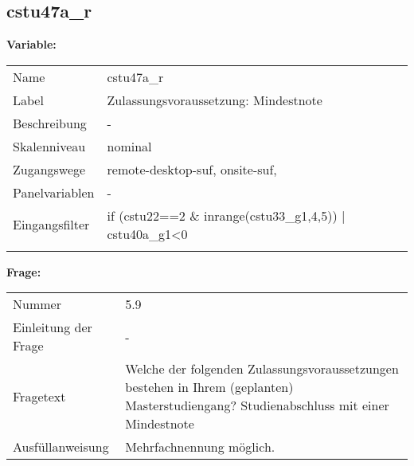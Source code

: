 	
	
	\subsection{cstu47a\_r}
	\label{subSection:cstu47a_r}

	\noindent\textbf{Variable:}\\
		\begin{tabular}{lL{11.3cm}}
			\label{tableVariable:cstu47a_r}
			Name & cstu47a\_r \\
			Label & Zulassungsvoraussetzung: Mindestnote \\
			Beschreibung & - \\
			Skalenniveau & nominal \\
			Zugangswege &
				remote-desktop-suf,
				onsite-suf,
 \\
			Panelvariablen & -
			 \\
			Eingangsfilter & if (cstu22==2 \& inrange(cstu33\_g1,4,5)) | cstu40a\_g1\textless{}0 \\
 \\
		\end{tabular}

		\vspace*{1 cm}
		\noindent\textbf{Frage:}\\
		\begin{tabular}{lL{11.3cm}}
			\label{tableQuestion:cstu47a_r}
			Nummer & 5.9 \\
			Einleitung der Frage & - \\
			Fragetext & Welche der folgenden Zulassungsvoraussetzungen bestehen in Ihrem (geplanten) Masterstudiengang?
Studienabschluss mit einer Mindestnote \\
			Ausfüllanweisung & Mehrfachnennung möglich. \\
		\end{tabular}






